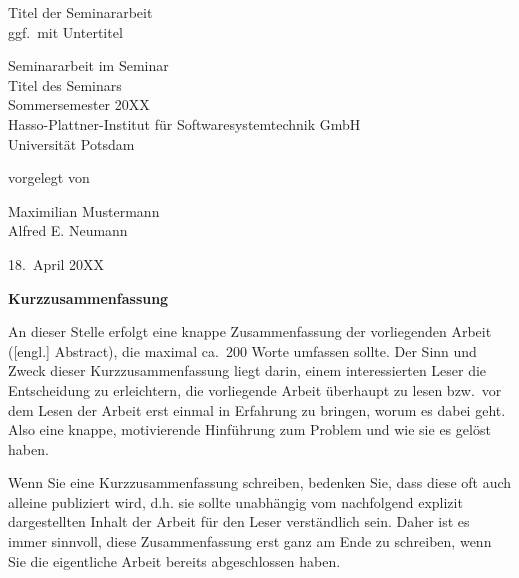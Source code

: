 \documentclass[11pt, a4paper]{article}
\begin{document}
          

\begin{titlepage}
  \begin{center} 
    \mbox{}
    \vspace{1cm}
    
    {\huge Titel der Seminararbeit \\[1em] {\LARGE ggf.~mit Untertitel}}  
        
    \vspace{5cm}
    
    Seminararbeit im Seminar \\[1em]
    {\large \sc Titel des Seminars} \\[1em]
    Sommersemester 20XX \\[1em]
    Hasso-Plattner-Institut für Softwaresystemtechnik GmbH \\[1em]
    Universität Potsdam
    
    \vspace{4cm}
    
		vorgelegt von
		
    \vspace{1em}
    
		{\Large Maximilian Mustermann} \\
		{\Large Alfred E. Neumann}
		
    \vspace{4em}
    
    18.~April 20XX
  \end{center}
\end{titlepage}


\setcounter{page}{1}

\begin{center}
{\bf Kurzzusammenfassung} 
\end{center}

\noindent
An dieser Stelle erfolgt eine knappe Zusammenfassung der vorliegenden Arbeit ([engl.] Abstract), die maximal ca.~200 Worte umfassen sollte. 
Der Sinn und Zweck dieser Kurzzusammenfassung liegt darin, einem interessierten Leser die Entscheidung zu erleichtern, die vorliegende Arbeit überhaupt zu lesen bzw.~vor dem Lesen der Arbeit erst einmal in Erfahrung zu bringen, worum es dabei geht.
Also eine knappe, motivierende Hinführung zum Problem und wie sie es gelöst haben.

\bigskip

Wenn Sie eine Kurzzusammenfassung schreiben, bedenken Sie, dass diese oft auch alleine publiziert wird, d.h. sie sollte unabhängig vom nachfolgend explizit dargestellten Inhalt der Arbeit für den Leser verständlich sein.
Daher ist es immer sinnvoll, diese Zusammenfassung erst ganz am Ende zu schreiben, wenn Sie die eigentliche Arbeit bereits abgeschlossen haben.
\end{document}
